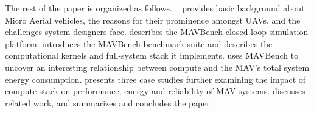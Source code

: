 The rest of the paper is organized as follows. 
~ provides basic background about Micro Aerial vehicles, the reasons for their prominence amongst UAVs, and the challenges system designers face.   describes the MAVBench closed-loop simulation platform.  introduces the MAVBench benchmark suite and describes the computational kernels and full-system stack it implements.  uses MAVBench to uncover an interesting relationship between compute and the MAV's total system energy consumption.  presents three case studies further examining the impact of compute stack on performance, energy and reliability of MAV systems.  discusses related work, and  summarizes and concludes the paper.
       